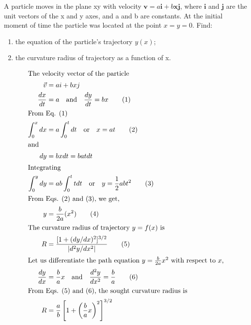 
\item A particle moves in the plane xy with velocity \(\mathbf{v} = a\mathbf{i} + b\mathbf{x}\mathbf{j}\), where \(\mathbf{i}\) and \(\mathbf{j}\) are the unit vectors of the x and y axes, and a and b are constants. At the initial moment of time the particle was located at the point \(x = y = 0\). Find:
    \begin{enumerate}
        \item the equation of the particle's trajectory \(y(x)\);
        \item the curvature radius of trajectory as a function of x.
    \end{enumerate}
\begin{solution}
    \begin{align*}
        \intertext{The velocity vector of the particle}
        \vec{v} &= ai + bxj \\
        \frac{dx}{dt} &= a \quad \text{and} \quad \frac{dy}{dt} = bx \tag{1} \\
        \intertext{From Eq. (1)}
        \int_0^x dx &= a \int_0^t dt \quad \text{or} \quad x = at \tag{2} \\
        \intertext{and}
        dy &= bx dt = bat dt \\
        \intertext{Integrating}
        \int_0^y dy &= ab \int_0^t t dt \quad \text{or} \quad y = \frac{1}{2}abt^2 \tag{3} \\
        \intertext{From Eqs. (2) and (3), we get,}
        y &= \frac{b}{2a}(x^2) \tag{4} \\
        \intertext{The curvature radius of trajectory \( y = f(x) \) is}
        R &= \frac{[1 + (dy/dx)^2]^{3/2}}{|d^2y/dx^2|} \tag{5} \\
        \intertext{Let us differentiate the path equation \( y = \frac{b}{2a}x^2 \) with respect to \( x \),}
        \frac{dy}{dx} &= \frac{b}{a}x \quad \text{and} \quad \frac{d^2y}{dx^2} = \frac{b}{a} \tag{6} \\
        \intertext{From Eqs. (5) and (6), the sought curvature radius is}
        R &= \frac{a}{b} \left[ 1 + \left( \frac{b}{a} x \right)^2 \right]^{3/2}
    \end{align*}
\end{solution}